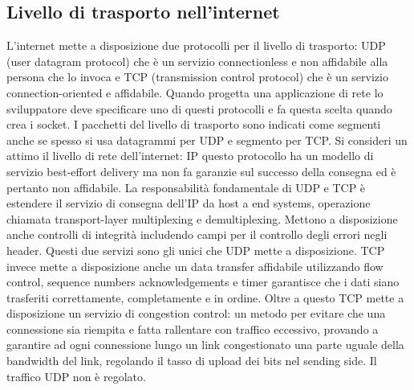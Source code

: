 \subsection{Livello di trasporto nell'internet}
L'internet mette a disposizione due protocolli per il livello di trasporto: UDP (user datagram protocol) che \`e un servizio connectionless e non affidabile 
alla persona che lo invoca e TCP (transmission control protocol) che \`e un servizio connection-oriented e affidabile. Quando progetta una applicazione di 
rete lo sviluppatore deve specificare uno di questi protocolli e fa questa scelta quando crea i socket. I pacchetti del livello di trasporto sono indicati
come segmenti anche se spesso si usa datagrammi per UDP e segmento per TCP. Si consideri un attimo il livello di rete dell'internet: IP questo protocollo
ha un modello di servizio best-effort delivery ma non fa garanzie sul successo della consegna ed \`e pertanto non affidabile. La responsabilit\`a 
fondamentale di UDP e TCP \`e estendere il servizio di consegna dell'IP da host a end systems, operazione chiamata transport-layer multiplexing e 
demultiplexing. Mettono a disposizione anche controlli di integrit\`a includendo campi per il controllo degli errori negli header. Questi due servizi sono
gli unici che UDP mette a disposizione. TCP invece mette a disposizione anche un data transfer affidabile utilizzando flow control, sequence numbers 
acknowledgements e timer garantisce che i dati siano trasferiti correttamente, completamente e in ordine. Oltre a questo TCP mette a disposizione un 
servizio di congestion control: un metodo per evitare che una connessione sia riempita e fatta rallentare con traffico eccessivo, provando a garantire ad 
ogni connessione lungo un link congestionato una parte uguale della bandwidth del link, regolando il tasso di upload dei bits nel sending side. Il traffico 
UDP non \`e regolato. 
